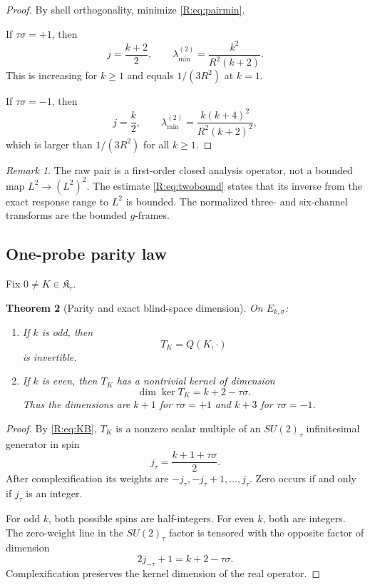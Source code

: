 \documentclass[
 aps,
 prd,
 reprint,
 amsmath,
 amssymb,
 nofootinbib,
 superscriptaddress
]{revtex4-2}
\newtheorem{theorem}{Theorem}[section]
\theoremstyle{definition}
\theoremstyle{remark}
\newtheorem{remark}[theorem]{Remark}
\newcommand{\cK}{\mathfrak K}
\begin{document}
\begin{proof}
By shell orthogonality, minimize \eqref{R:eq:pairmin}.

If $\tau\sigma=+1$, then
\[
 j=\frac{k+2}{2},
 \qquad
 \lambda_{\min}^{(2)}
 =
 \frac{k^2}{R^2(k+2)}.
 \label{R:eq:same}
\]
This is increasing for $k\ge1$ and equals $1/(3R^2)$ at $k=1$.

If $\tau\sigma=-1$, then
\[
 j=\frac{k}{2},
 \qquad
 \lambda_{\min}^{(2)}
 =
 \frac{k(k+4)^2}{R^2(k+2)^2},
 \label{R:eq:opp}
\]
which is larger than $1/(3R^2)$ for all $k\ge1$.
\end{proof}

\begin{remark}
The raw pair is a first-order closed analysis operator, not a bounded map
$L^2\to(L^2)^2$.  The estimate \eqref{R:eq:twobound} states that its inverse
from the exact response range to $L^2$ is bounded.  The normalized
three- and six-channel transforms are the bounded $g$-frames.
\end{remark}

\subsection{One-probe parity law}

Fix $0\ne K\in\cK_\tau$.

\begin{theorem}[Parity and exact blind-space dimension]
\label{R:thm:parity}
On $E_{k,\sigma}$:

\begin{enumerate}[label=(\roman*)]
\item If $k$ is odd, then
\[
       T_K=Q(K,\cdot)
\]
is invertible.

\item If $k$ is even, then $T_K$ has a nontrivial kernel of dimension
\begin{equation}
 \boxed{
 \dim\ker T_K
 =
 k+2-\tau\sigma.
 }
 \label{R:eq:kerneldim}
\end{equation}
Thus the dimensions are $k+1$ for $\tau\sigma=+1$ and $k+3$ for
$\tau\sigma=-1$.
\end{enumerate}
\end{theorem}

\begin{proof}
By \eqref{R:eq:KB}, $T_K$ is a nonzero scalar multiple of an
$SU(2)_\tau$ infinitesimal generator in spin
\[
       j_\tau=\frac{k+1+\tau\sigma}{2}.
\]
After complexification its weights are
$-j_\tau,-j_\tau+1,\ldots,j_\tau$.
Zero occurs if and only if $j_\tau$ is an integer.

For odd $k$, both possible spins are half-integers.
For even $k$, both are integers.  The zero-weight line in the
$SU(2)_\tau$ factor is tensored with the opposite factor of dimension
\[
       2j_{-\tau}+1
       =
       k+2-\tau\sigma.
\]
Complexification preserves the kernel dimension of the real operator.
\end{proof}
\end{document}
